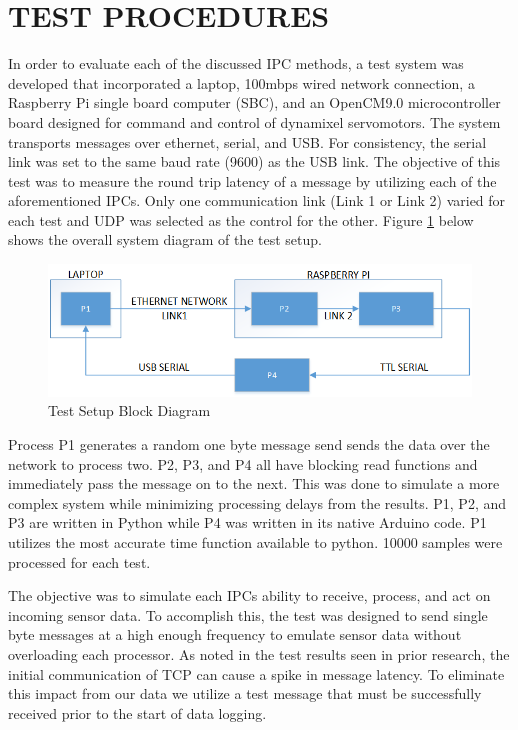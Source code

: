 \section{TEST PROCEDURES}

In order to evaluate each of the discussed IPC methods, a test system was developed that incorporated a laptop, 100mbps wired network connection, a Raspberry Pi single board computer (SBC), and an OpenCM9.0 microcontroller board designed for command and control of dynamixel servomotors. The system transports messages over ethernet, serial, and USB. For consistency, the serial link was set to the same baud rate (9600) as the USB link. The objective of this test was to measure the round trip latency of a message by utilizing each of the aforementioned IPCs. Only one communication link (Link 1 or Link 2) varied for each test and UDP was selected as the control for the other. Figure \ref{fig:test block diag} below shows the overall system diagram of the test setup. 

\begin{figure}[thpb]
 \centering
 \includegraphics[width=1.0\columnwidth]{./images/testblock.png}
  \caption{Test Setup Block Diagram}
  \label{fig:test block diag}
\end{figure} 

Process P1 generates a random one byte message send sends the data over the network to process two. P2, P3, and P4 all have blocking read functions and immediately pass the message on to the next. This was done to simulate a more complex system while minimizing processing delays from the results. P1, P2, and P3 are written in Python while P4 was written in its native Arduino code. P1 utilizes the most accurate time function available to python. 10000 samples were processed for each test.

The objective was to simulate each IPCs ability to receive, process, and act on incoming sensor data. To accomplish this, the test was designed to send single byte messages at a high enough frequency to emulate sensor data without overloading each processor. As noted in the test results seen in prior research\cite{REALTIMEACH}, the initial communication of TCP can cause a spike in message latency. To eliminate this impact from our data we utilize a test message that must be successfully received prior to the start of data logging. 

